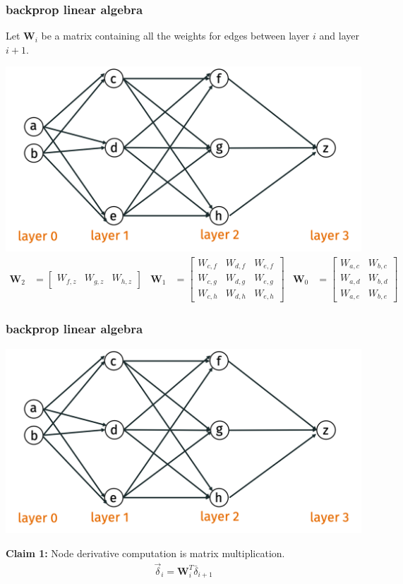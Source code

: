 \documentclass[handout,compress]{beamer}
\newcommand{\bv}[1]{\mathbf{#1}}
\begin{document}
\begin{frame}
	\frametitle{backprop linear algebra}
	\small
	 
	Let $\bv{W}_i$ be a matrix containing all the weights for edges between layer $i$ and layer $i+1$. 
	
	\includegraphics[width=.5\textwidth]{backpro_example.png}
	\begin{align*}
	\bv{W}_2 &= \begin{bmatrix}W_{f,z}&W_{g,z}& W_{h,z}\end{bmatrix} & \bv{W}_1 &= \begin{bmatrix}W_{c,f}&W_{d,f}& W_{e,f}\\
	W_{c,g}&W_{d,g}& W_{e,g}\\
	W_{c,h}&W_{d,h}& W_{e,h}
	\end{bmatrix}
	& \bv{W}_0 &= \begin{bmatrix}W_{a,c}&W_{b,c}\\
	W_{a,d}&W_{b,d}\\
	W_{a,e}&W_{b,e}
	\end{bmatrix}
	\end{align*}
\end{frame}

\begin{frame}
	\frametitle{backprop linear algebra}
	\small
	
	\includegraphics[width=.5\textwidth]{backpro_example.png}

	\textbf{Claim 1:} Node derivative computation is matrix multiplication.
	\begin{align*}
		\vec{\delta}_i = \bv{W}_i^T \bar{\delta}_{i+1}
	\end{align*}
\end{frame}
\end{document}
